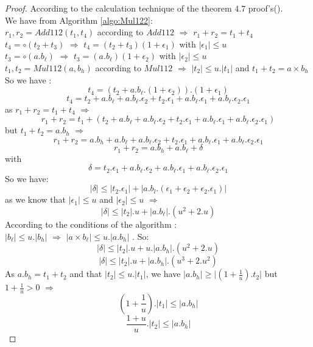 \begin{proof} \color{-yellow}
According to the calculation technique of the theorem $4.7$ proof's(\cite{lauter2005basic}).\\
We have from Algorithm \ref{algo:Mul122}:\\
$r_1,r_2 = Add112(t_1,t_4)$ according to $Add112$ $\Rightarrow$ $r_1+r_2 = t_1+t_4$\\
$t_4 = \circ (t_2+t_3)$ $\Rightarrow$ $t_4 = (t_2+t_3)(1+\epsilon_1)$ with $\lvert \epsilon_1 \rvert \le u$\\
$t_3 = \circ (a.b_{\ell})$ $\Rightarrow$ $t_3 = (a.b_{\ell})(1+\epsilon_2)$ with $\lvert \epsilon_2 \rvert \le u$\\
$t_1,t_2 = Mul112(a,b_h)$ according to $Mul112$  $\Rightarrow$ $\lvert t_2 \rvert \le u .\lvert t_1 \rvert$ and
$t_1 + t_2 =  a \times b_h $\\
So we have :
$$t_4 = (t_2 +a.b_{\ell}.(1+\epsilon_2)).(1+\epsilon_1)$$
$$t_4 = t_2 +a.b_{\ell}+ a.b_{\ell}.\epsilon_2+ t_2.\epsilon_1 + a.b_{\ell}.\epsilon_1+ a.b_{\ell}.\epsilon_2.\epsilon_1$$
as $r_1+r_2 = t_1+t_4$ $\Rightarrow$
$$r_1+r_2 = t_1 +(t_2 +a.b_{\ell}+ a.b_{\ell}.\epsilon_2+ t_2.\epsilon_1 + a.b_{\ell}.\epsilon_1+ a.b_{\ell}.\epsilon_2.\epsilon_1) $$
but $t_1+t_2 = a.b_h$ $\Rightarrow$
$$r_1+r_2 =a.b_h +a.b_{\ell}+ a.b_{\ell}.\epsilon_2+ t_2.\epsilon_1 + a.b_{\ell}.\epsilon_1+ a.b_{\ell}.\epsilon_2.\epsilon_1 $$
$$r_1+r_2 = a.b_h+a. b_{\ell} + \delta $$ 
with 
$$\delta = t_2.\epsilon_1 + a.b_{\ell}.\epsilon_2 + a.b_{\ell}.\epsilon_1 + a.b_{\ell}.\epsilon_2.\epsilon_1$$
So we have:
$$ \lvert \delta \rvert \le \lvert t_2.\epsilon_1 \rvert + \lvert a.b_l.(\epsilon_1 + \epsilon_2 + \epsilon_2.\epsilon_1  )\rvert  $$
as we know that $\lvert \epsilon_1 \rvert \le u$ and $\lvert \epsilon_2 \rvert \le u$ $\Rightarrow$
$$ \lvert \delta \rvert \le \lvert t_2 \rvert .u + \lvert a.b_{\ell} \rvert .(u^2 +2.u)  $$
According to the conditions of the algorithm :\\
 $\lvert b_{\ell} \rvert \le u. \lvert b_h \rvert$ $\Rightarrow$
$\lvert a \times b_{\ell} \rvert \le u. \lvert a. b_h\rvert$ .   
So:
$$ \lvert \delta \rvert \le \lvert t_2 \rvert .u + u.\lvert a.b_h \rvert .(u^2 +2.u)  $$
$$ \lvert \delta \rvert \le \lvert t_2 \rvert .u + \lvert a.b_h \rvert .(u^3 +2.u^2) $$
As $a.b_h = t_1 + t_2$ and that $ \lvert t_2 \rvert \le u. \lvert t_1 \rvert$, we have  $ \lvert a.b_h \rvert \ge \lvert (1 + \frac{1}{u}) . t_2 \rvert$ but $1+ \frac{1}{u} > 0$ $\Rightarrow$
$$ (1 + \frac{1}{u}) .\lvert t_1 \rvert  \le \lvert a.b_h \rvert $$
$$  \frac{1+u}{u} .\lvert t_2 \rvert  \le \lvert a.b_h \rvert $$

\end{proof}
